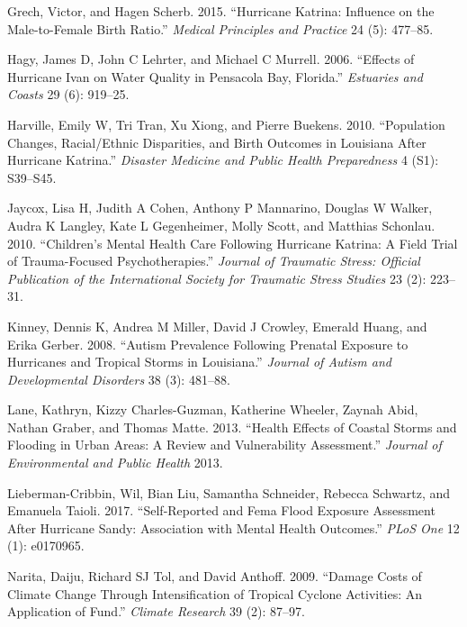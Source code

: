 \documentclass[
]{article}
\begin{document}
\leavevmode\hypertarget{ref-grech2015hurricane}{}%
Grech, Victor, and Hagen Scherb. 2015. ``Hurricane Katrina: Influence on
the Male-to-Female Birth Ratio.'' \emph{Medical Principles and Practice}
24 (5): 477--85.

\leavevmode\hypertarget{ref-hagy2006effects}{}%
Hagy, James D, John C Lehrter, and Michael C Murrell. 2006. ``Effects of
Hurricane Ivan on Water Quality in Pensacola Bay, Florida.''
\emph{Estuaries and Coasts} 29 (6): 919--25.

\leavevmode\hypertarget{ref-harville2010population}{}%
Harville, Emily W, Tri Tran, Xu Xiong, and Pierre Buekens. 2010.
``Population Changes, Racial/Ethnic Disparities, and Birth Outcomes in
Louisiana After Hurricane Katrina.'' \emph{Disaster Medicine and Public
Health Preparedness} 4 (S1): S39--S45.

\leavevmode\hypertarget{ref-jaycox2010children}{}%
Jaycox, Lisa H, Judith A Cohen, Anthony P Mannarino, Douglas W Walker,
Audra K Langley, Kate L Gegenheimer, Molly Scott, and Matthias Schonlau.
2010. ``Children's Mental Health Care Following Hurricane Katrina: A
Field Trial of Trauma-Focused Psychotherapies.'' \emph{Journal of
Traumatic Stress: Official Publication of the International Society for
Traumatic Stress Studies} 23 (2): 223--31.

\leavevmode\hypertarget{ref-kinney2008autism}{}%
Kinney, Dennis K, Andrea M Miller, David J Crowley, Emerald Huang, and
Erika Gerber. 2008. ``Autism Prevalence Following Prenatal Exposure to
Hurricanes and Tropical Storms in Louisiana.'' \emph{Journal of Autism
and Developmental Disorders} 38 (3): 481--88.

\leavevmode\hypertarget{ref-lane2013health}{}%
Lane, Kathryn, Kizzy Charles-Guzman, Katherine Wheeler, Zaynah Abid,
Nathan Graber, and Thomas Matte. 2013. ``Health Effects of Coastal
Storms and Flooding in Urban Areas: A Review and Vulnerability
Assessment.'' \emph{Journal of Environmental and Public Health} 2013.

\leavevmode\hypertarget{ref-lieberman2017self}{}%
Lieberman-Cribbin, Wil, Bian Liu, Samantha Schneider, Rebecca Schwartz,
and Emanuela Taioli. 2017. ``Self-Reported and Fema Flood Exposure
Assessment After Hurricane Sandy: Association with Mental Health
Outcomes.'' \emph{PLoS One} 12 (1): e0170965.

\leavevmode\hypertarget{ref-narita2009damage}{}%
Narita, Daiju, Richard SJ Tol, and David Anthoff. 2009. ``Damage Costs
of Climate Change Through Intensification of Tropical Cyclone
Activities: An Application of Fund.'' \emph{Climate Research} 39 (2):
87--97.
\end{document}
